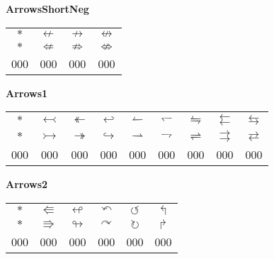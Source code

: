 \documentclass[12pt]{report}
\newlength{\mine}
\newlength{\niz}
\def\pmb{}
\begin{document}
\textbf{ArrowsShortNeg}
\par\nobreak\vspace{2mm}
\begin{tabular}{|c|ccc|}
  \hline
   $\pmb *               $&
   $\pmb\nleftarrow      $&
   $\pmb\nrightarrow     $&
   $\pmb\nleftrightarrow $\\[\mine]
   $\pmb *               $&
   $\pmb\nLeftarrow      $&
   $\pmb\nRightarrow     $&
   $\pmb\nLeftrightarrow $\\[\niz]
  \hline\hline
  000&000&000&000\\
  \hline
\end{tabular}
\goodbreak\par\vspace{3mm}

\textbf{Arrows1}
\par\nobreak\vspace{2mm}
\begin{tabular}{|c|cccccccc|}
  \hline
   $\pmb *                 $&
   $\pmb\leftarrowtail     $&
   $\pmb\twoheadleftarrow  $&
   $\pmb\hookleftarrow     $&
   $\pmb\leftharpoonup     $&
   $\pmb\leftharpoondown   $&
   $\pmb\leftrightharpoons $&
   $\pmb\leftleftarrows    $&
   $\pmb\leftrightarrows   $\\[\mine]
   $\pmb *                 $&
   $\pmb\rightarrowtail    $&
   $\pmb\twoheadrightarrow $&
   $\pmb\hookrightarrow    $&
   $\pmb\rightharpoonup    $&
   $\pmb\rightharpoondown  $&
   $\pmb\rightleftharpoons $&
   $\pmb\rightrightarrows  $&
   $\pmb\rightleftarrows   $\\[\niz]
  \hline\hline
  000&000&000&000&000&000&000&000&000\\
  \hline
\end{tabular}
\goodbreak\par\vspace{3mm}

\textbf{Arrows2}
\par\nobreak\vspace{2mm}
\begin{tabular}{|c|ccccc|}
  \hline
   $\pmb *                 $&
   $\pmb\Lleftarrow        $&
   $\pmb\looparrowleft     $&
   $\pmb\curvearrowleft    $&
   $\pmb\circlearrowleft   $&
   $\pmb\Lsh               $\\[\mine]
   $\pmb *                 $&
   $\pmb\Rrightarrow       $&
   $\pmb\looparrowright    $&
   $\pmb\curvearrowright   $&
   $\pmb\circlearrowright  $&
   $\pmb\Rsh               $\\[\niz]
  \hline\hline
  000&000&000&000&000&000\\
  \hline
\end{tabular}
\goodbreak\par\vspace{3mm}
\end{document}
